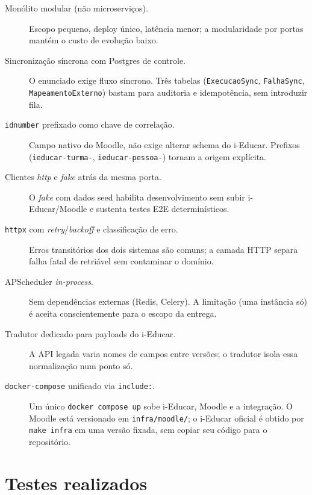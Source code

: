 \documentclass[
	12pt,
	oneside,
	a4paper,
	chapter=TITLE,
	section=TITLE,
	sumario=tradicional,
	english,
	brazil
]{abntex2}
\begin{document}
\begin{description}
    \item[Monólito modular (não microserviços).] Escopo pequeno, deploy único, latência
    menor; a modularidade por portas mantém o custo de evolução baixo.
    \item[Sincronização síncrona com Postgres de controle.] O enunciado exige fluxo
    síncrono. Três tabelas (\texttt{ExecucaoSync}, \texttt{FalhaSync},
    \texttt{MapeamentoExterno}) bastam para auditoria e idempotência, sem introduzir fila.
    \item[\texttt{idnumber} prefixado como chave de correlação.] Campo nativo do Moodle,
    não exige alterar schema do i-Educar. Prefixos (\texttt{ieducar-turma-},
    \texttt{ieducar-pessoa-}) tornam a origem explícita.
    \item[Clientes \emph{http} e \emph{fake} atrás da mesma porta.] O \emph{fake} com
    dados seed habilita desenvolvimento sem subir i-Educar/Moodle e sustenta testes E2E
    determinísticos.
    \item[\texttt{httpx} com \emph{retry}/\emph{backoff} e classificação de erro.] Erros
    transitórios dos dois sistemas são comuns; a camada HTTP separa falha fatal de
    retriável sem contaminar o domínio.
    \item[APScheduler \emph{in-process}.] Sem dependências externas (Redis, Celery). A
    limitação (uma instância só) é aceita conscientemente para o escopo da entrega.
    \item[Tradutor dedicado para payloads do i-Educar.] A API legada varia nomes de campos
    entre versões; o tradutor isola essa normalização num ponto só.
    \item[\texttt{docker-compose} unificado via \texttt{include:}.] Um único
    \texttt{docker compose up} sobe i-Educar, Moodle e a integração. O Moodle está
    versionado em \texttt{infra/moodle/}; o i-Educar oficial é obtido por
    \texttt{make infra} em uma versão fixada, sem copiar seu código para o repositório.
\end{description}

\chapter{Testes realizados}
\end{document}
